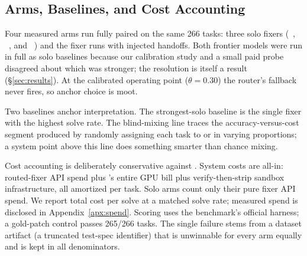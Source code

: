 \subsection{Arms, Baselines, and Cost Accounting}
\label{sec:setup-arms}

Four measured arms run fully paired on the same 266 tasks: three solo
fixers (\fxopus~\citep{opus46}, \fxgpt~\citep{gpt52}, and
\fxkimi~\citep{kimik25}) and the \sysname fixer runs with injected
handoffs.  Both frontier models were run in full as solo baselines
because our calibration study and a small paid probe disagreed about
which was stronger; the resolution is itself a result
(\S\ref{sec:results}).  At the calibrated operating point
($\theta{=}0.30$) the router's fallback never fires, so anchor choice is
moot.

Two baselines anchor interpretation.  The strongest-solo baseline is the
single fixer with the highest solve rate.  The blind-mixing line traces
the accuracy-versus-cost segment produced by randomly assigning each
task to \fxkimi or \fxopus in varying proportions; a system point above
this line does something smarter than chance mixing.

Cost accounting is deliberately conservative against \sysname.  System
costs are all-in: routed-fixer API spend plus \modelname's entire GPU
bill plus verify-then-strip sandbox infrastructure, all amortized per
task.  Solo arms count only their pure fixer API spend.  We report total
cost per solve at a matched solve rate; measured spend is disclosed in
Appendix~\ref{apx:spend}.  Scoring uses the benchmark's
official harness; a gold-patch control passes 265/266 tasks.  The single
failure stems from a dataset artifact (a truncated test-spec
identifier) that is unwinnable for every arm equally and is kept in all
denominators.
